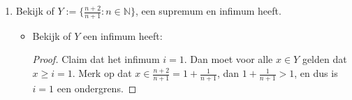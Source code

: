 \documentclass{article}
\newcommand{\f}[2]{\frac{#1}{#2}}
\newcommand{\N}{\mathbb{N}}
\begin{document}
\begin{enumerate}[label=\arabic*]
\begin{enumerate}[label=\alph*)]
\begin{enumerate}
\begin{itemize}
\begin{proof}
                                            Nu moeten we nog laten zien dat $s = 1$ de kleinste bovengrens is.
                                            Neem $x = 1 - \f{1}{n+2}$, dan moet gelden $\forall epsilon > 0$ dat:
                                            \[1 - \epsilon < x\]
                                            Waarbij $1$ de gesuggereerde bovengrens $s$ is.
                                            substitueer $x = 1 - \f{1}{n+2}$:
                                            \[1 - \epsilon < 1- \f{1}{n+2}\]
                                            Neem aan dat $\epsilon > \f{1}{n+2}$ dan is er altijd een
                                            $x$ waarvoor epsilon groter is als we $n$ groot genoeg maken.
                                            Hieruit volgt dus dat $s = 1$ de kleinste bovengrens moet zijn.
                                        \end{proof}
                              \end{itemize}
                        \item Bekijk of $Y:= \{\f{n+2}{n+1}: n \in \N\}$, een supremum en infimum heeft.
                              \begin{itemize}
                                  \item Bekijk of $Y$ een infimum heeft:
                                        \begin{proof}
                                            Claim dat het infimum $i = 1$.
                                            Dan moet voor alle $x \in Y$ gelden dat $x \geq i = 1$.
                                            Merk op dat $x \in \f{n+2}{n+1} = 1 + \f{1}{n+1}$, dan
                                            $1 + \f{1}{n+1} > 1$, en dus is $i=1$ een ondergrens.


\end{proof}
\end{itemize}
\end{enumerate}
\end{enumerate}
\end{enumerate}
\end{document}
